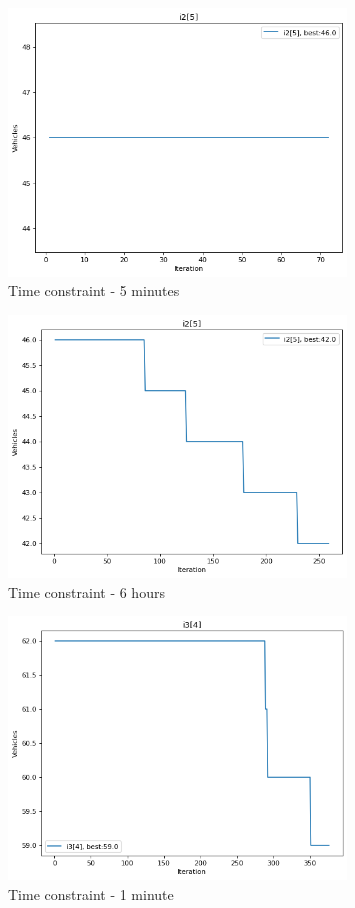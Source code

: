 \documentclass{article}
\begin{document}
\begin{figure}
\centering
\includegraphics[width=0.8\textwidth]{i2[5]_5_vehicles.png}
\caption{\label{fig:i2[5]_5_vehicles}Time constraint - 5 minutes}
\end{figure}

\begin{figure}
\centering
\includegraphics[width=0.8\textwidth]{i2[5]_360_vehicles.png}
\caption{\label{fig:i2[5]_360_vehicles}Time constraint - 6 hours}
\end{figure}

\begin{figure}
\centering
\includegraphics[width=0.8\textwidth]{i3[4]_1_vehicles.png}
\caption{\label{fig:i3[4]_1_vehicles}Time constraint - 1 minute}
\end{figure}
\end{document}
